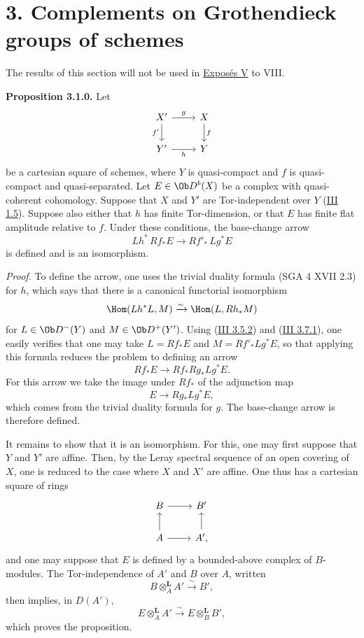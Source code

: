 \section*{3. Complements on Grothendieck groups of schemes}

The results of this section will not be used in \hyperlink{sga6.e05.expose}{Exposés V} to VIII.

\textbf{Proposition 3.1.0.} Let
\[
\begin{tikzcd}
X' \arrow[r,"g"]\arrow[d,"f'"'] & X\arrow[d,"f"]\\
Y' \arrow[r,"h"'] & Y
\end{tikzcd}
\]
be a cartesian square of schemes, where \(Y\) is quasi-compact and \(f\) is quasi-compact and quasi-separated. Let \(E\in\Ob D^b(X)\) be a complex with quasi-coherent cohomology. Suppose that \(X\) and \(Y'\) are Tor-independent over \(Y\) (\hyperlink{sga6.e03.def.1-5}{III 1.5}). Suppose also either that \(h\) has finite Tor-dimension, or that \(E\) has finite flat amplitude relative to \(f\). Under these conditions, the base-change arrow
\[
 Lh^*\,Rf_*E\longrightarrow Rf'_*\,Lg^*E
\]
is defined and is an isomorphism.

\emph{Proof.} To define the arrow, one uses the trivial duality formula (SGA 4 XVII 2.3) for \(h\), which says that there is a canonical functorial isomorphism
\[
 \Hom(Lh^*L,M)\xrightarrow{\sim}\Hom(L,Rh_*M)
\]
for \(L\in\Ob D^-(Y)\) and \(M\in\Ob D^+(Y')\). Using (\hyperlink{sga6.e03.cor.3-5-2}{III 3.5.2}) and (\hyperlink{sga6.e03.cor.3-7-1}{III 3.7.1}), one easily verifies that one may take \(L=Rf_*E\) and \(M=Rf'_*Lg^*E\), so that applying this formula reduces the problem to defining an arrow
\[
 Rf_*E\longrightarrow Rf_*Rg_*Lg^*E.
\]
For this arrow we take the image under \(Rf_*\) of the adjunction map
\[
 E\longrightarrow Rg_*Lg^*E,
\]
which comes from the trivial duality formula for \(g\). The base-change arrow is therefore defined.

It remains to show that it is an isomorphism. For this, one may first suppose that \(Y\) and \(Y'\) are affine. Then, by the Leray spectral sequence of an open covering of \(X\), one is reduced to the case where \(X\) and \(X'\) are affine. One thus has a cartesian square of rings
\[
\begin{tikzcd}
B\arrow[r] & B'\\
A\arrow[u]\arrow[r] & A'\arrow[u],
\end{tikzcd}
\]
and one may suppose that \(E\) is defined by a bounded-above complex of \(B\)-modules. The Tor-independence of \(A'\) and \(B\) over \(A\), written
\[
 B\otimes_A^{\mathbf L}A'\xrightarrow{\sim}B',
\]
then implies, in \(D(A')\),
\[
 E\otimes_A^{\mathbf L}A'\xrightarrow{\sim}E\otimes_B^{\mathbf L}B',
\]
which proves the proposition.

